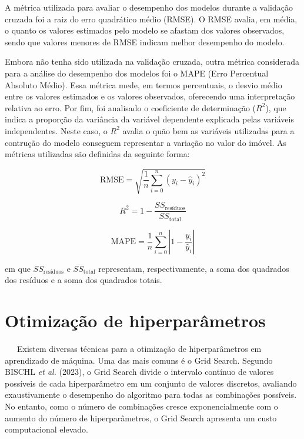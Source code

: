 \documentclass[
  12pt,
  a4paper,
]{scrreprt}
\begin{document}
\vspace{12pt}

A métrica utilizada para avaliar o desempenho dos modelos durante a
validação cruzada foi a raiz do erro quadrático médio (RMSE). O RMSE
avalia, em média, o quanto os valores estimados pelo modelo se afastam
dos valores observados, sendo que valores menores de RMSE indicam melhor
desempenho do modelo.

\vspace{12pt}

Embora não tenha sido utilizada na validação cruzada, outra métrica
considerada para a análise do desempenho dos modelos foi o MAPE (Erro
Percentual Absoluto Médio). Essa métrica mede, em termos percentuais, o
desvio médio entre os valores estimados e os valores observados,
oferecendo uma interpretação relativa ao erro. Por fim, foi analisado o
coeficiente de determinação (\(R^2\)), que indica a proporção da
variância da variável dependente explicada pelas variáveis
independentes. Neste caso, o \(R^2\) avalia o quão bem as variáveis
utilizadas para a contrução do modelo conseguem representar a variação
no valor do imóvel. As métricas utilizadas são definidas da seguinte
forma:

\begin{figure}

\begin{minipage}{0.33\linewidth}
\[
\text{RMSE} = \sqrt{\dfrac{1}{n} \sum_{i = 0}^n (y_i - \hat y_i)^2}
\]\end{minipage}%
%
\begin{minipage}{0.33\linewidth}
\[
R^2 = 1 - \dfrac{SS_{\text{resíduos}}}{SS_{\text{total}}}
\]\end{minipage}%
%
\begin{minipage}{0.33\linewidth}
\[
\text{MAPE} = \frac{1}{n} \sum_{i=0}^n \left|1 - \frac{y_i}{\hat y_i}\right|
\]\end{minipage}%

\end{figure}%

em que \(SS_{\text{resíduos}}\) e \(SS_{\text{total}}\) representam,
respectivamente, a soma dos quadrados dos resíduos e a soma dos
quadrados totais.

\section{Otimização de
hiperparâmetros}\label{otimizauxe7uxe3o-de-hiperparuxe2metros}

~~~Existem diversas técnicas para a otimização de hiperparâmetros em
aprendizado de máquina. Uma das mais comuns é o Grid Search. Segundo
BISCHL \emph{et al.} (2023), o Grid Search divide o intervalo contínuo
de valores possíveis de cada hiperparâmetro em um conjunto de valores
discretos, avaliando exaustivamente o desempenho do algoritmo para todas
as combinações possíveis. No entanto, como o número de combinações
cresce exponencialmente com o aumento do número de hiperparâmetros, o
Grid Search apresenta um custo computacional elevado.
\end{document}
